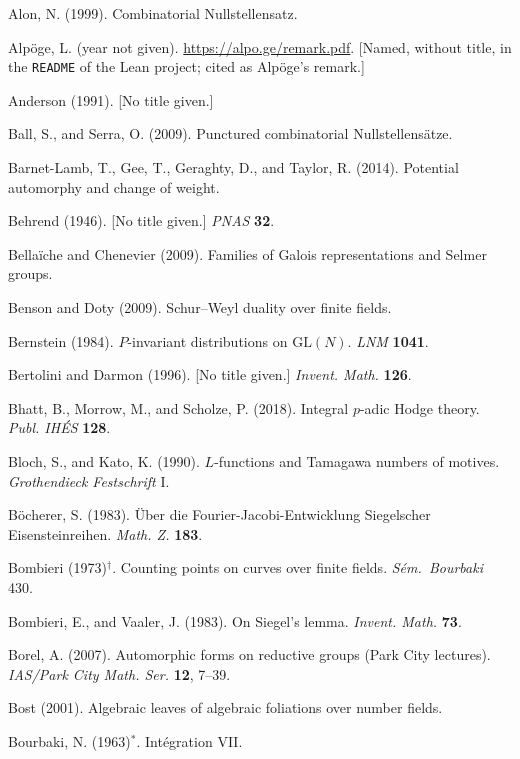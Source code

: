 \begin{list}{}{\setlength{\leftmargin}{1.5em}\setlength{\itemindent}{-1.5em}\setlength{\itemsep}{2pt}\setlength{\parsep}{0pt}}
\item Alon, N. (1999). Combinatorial Nullstellensatz.
\item Alp\"oge, L. (year not given). \url{https://alpo.ge/remark.pdf}. [Named, without title, in
  the \texttt{README} of the Lean project; cited as Alp\"oge's remark.]
\item Anderson (1991). [No title given.]
\item Ball, S., and Serra, O. (2009). Punctured combinatorial Nullstellens\"atze.
\item Barnet-Lamb, T., Gee, T., Geraghty, D., and Taylor, R. (2014). Potential automorphy and
  change of weight.
\item Behrend (1946). [No title given.] \emph{PNAS} \textbf{32}.
\item Bella\"iche and Chenevier (2009). Families of Galois representations and Selmer groups.
\item Benson and Doty (2009). Schur--Weyl duality over finite fields.
\item Bernstein (1984). $P$-invariant distributions on $\mathrm{GL}(N)$. \emph{LNM} \textbf{1041}.
\item Bertolini and Darmon (1996). [No title given.] \emph{Invent. Math.} \textbf{126}.
\item Bhatt, B., Morrow, M., and Scholze, P. (2018). Integral $p$-adic Hodge theory.
  \emph{Publ. IH\'ES} \textbf{128}.
\item Bloch, S., and Kato, K. (1990). $L$-functions and Tamagawa numbers of motives.
  \emph{Grothendieck Festschrift} I.
\item B\"ocherer, S. (1983). \"Uber die Fourier-Jacobi-Entwicklung Siegelscher Eisensteinreihen.
  \emph{Math. Z.} \textbf{183}.
\item Bombieri (1973)$^\dagger$. Counting points on curves over finite fields. \emph{S\'em.\ Bourbaki}
  430.
\item Bombieri, E., and Vaaler, J. (1983). On Siegel's lemma. \emph{Invent. Math.} \textbf{73}.
\item Borel, A. (2007). Automorphic forms on reductive groups (Park City lectures).
  \emph{IAS/Park City Math. Ser.} \textbf{12}, 7--39.
\item Bost (2001). Algebraic leaves of algebraic foliations over number fields.
\item Bourbaki, N. (1963)$^*$. Int\'egration VII.

\end{list}
